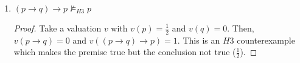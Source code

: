 \begin{enumerate}[label=\roman*.]
\begin{claim}
$\not\vDash_{H5} \neg p \lor \neg\neg p$
\end{claim}
\begin{proof}
Take a valuation v with $v(p) = b$. Then, $v(\neg p) = c$ and $v(\neg\neg p) = b$, so $v(\neg p \lor \neg\neg p) = 0$. This is an $H5$ counterexample.
\end{proof}


\item \leavevmode \vspace{-1.75\baselineskip}
\begin{claim}
$(p \to q) \to p \not\vDash_{H3} p$
\end{claim}
\begin{proof}
Take a valuation $v$ with $v(p) = \frac{1}{2}$ and $v(q) = 0$. Then, $v(p \to q) = 0$ and $v((p \to q) \to p) = 1$. This is an $H3$ counterexample which makes the premise true but the conclusion not true ($\frac{1}{2}$).
\end{proof}

\end{enumerate}
